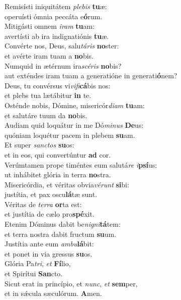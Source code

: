 \evenverse Remisísti iniquitátem \textit{ple}\textit{bis} \textbf{tu}æ:~\*\\
\evenverse operuísti ómnia peccáta e\textbf{ó}rum.\\
\oddverse Mitigásti omnem \textit{i}\textit{ram} \textbf{tu}am:~\*\\
\oddverse avertísti ab ira indignatiónis \textbf{tu}æ.\\
\evenverse Convérte nos, Deus, salu\textit{tá}\textit{ris} \textbf{no}ster:~\*\\
\evenverse et avérte iram tuam a \textbf{no}bis.\\
\oddverse Numquid in ætérnum ira\textit{scé}\textit{ris} \textbf{no}bis?~\*\\
\oddverse aut exténdes iram tuam a generatióne in generati\textbf{ó}nem?\\
\evenverse Deus, tu convérsus vi\textit{vi}\textit{fi}\textbf{cá}bis nos:~\*\\
\evenverse et plebs tua lætábitur \textbf{in} te.\\
\oddverse Osténde nobis, Dómine, misericór\textit{di}\textit{am} \textbf{tu}am:~\*\\
\oddverse et salutáre tuum da \textbf{no}bis.\\
\evenverse Audiam quid loquátur in me Dó\textit{mi}\textit{nus} \textbf{De}us:~\*\\
\evenverse quóniam loquétur pacem in plebem \textbf{su}am.\\
\oddverse Et super \textit{san}\textit{ctos} \textbf{su}os:~\*\\
\oddverse et in eos, qui convertúntur \textbf{ad} cor.\\
\evenverse Verúmtamen prope timéntes eum salutá\textit{re} \textit{i}\textbf{psí}us:~\*\\
\evenverse ut inhábitet glória in terra \textbf{no}stra.\\
\oddverse Misericórdia, et véritas obvia\textit{vé}\textit{runt} \textbf{si}bi:~\*\\
\oddverse justítia, et pax oscu\textbf{lá}tæ sunt.\\
\evenverse Véritas de \textit{ter}\textit{ra} \textbf{or}ta est:~\*\\
\evenverse et justítia de cælo pro\textbf{spé}xit.\\
\oddverse Etenim Dóminus dabit be\textit{ni}\textit{gni}\textbf{tá}tem:~\*\\
\oddverse et terra nostra dabit fructum \textbf{su}um.\\
\evenverse Justítia ante eum \textit{am}\textit{bu}\textbf{lá}bit:~\*\\
\evenverse et ponet in via gressus \textbf{su}os.\\
\oddverse Glória Pa\textit{tri}, \textit{et} \textbf{Fí}lio,~\*\\
\oddverse et Spirítui \textbf{San}cto.\\
\evenverse Sicut erat in princípio, et \textit{nunc}, \textit{et} \textbf{sem}per,~\*\\
\evenverse et in sǽcula sæculórum. \textbf{A}men.\\
